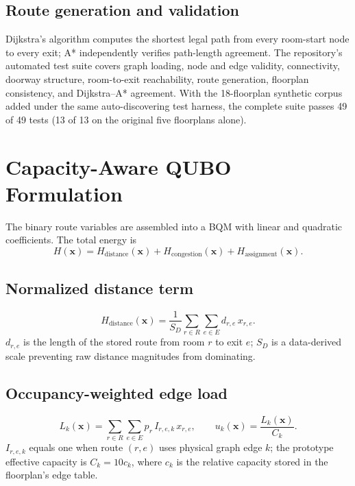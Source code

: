 \documentclass[11pt]{article}
\begin{document}
\subsection{Route generation and validation}
Dijkstra's algorithm computes the shortest legal path from every room-start node to every exit; A* independently verifies path-length agreement. The repository's automated test suite covers graph loading, node and edge validity, connectivity, doorway structure, room-to-exit reachability, route generation, floorplan consistency, and Dijkstra--A* agreement. With the 18-floorplan synthetic corpus added under the same auto-discovering test harness, the complete suite passes 49 of 49 tests (13 of 13 on the original five floorplans alone).

\section{Capacity-Aware QUBO Formulation}

The binary route variables are assembled into a BQM with linear and quadratic coefficients. The total energy is
\begin{equation}
H(\mathbf{x}) = H_{\text{distance}}(\mathbf{x}) + H_{\text{congestion}}(\mathbf{x}) + H_{\text{assignment}}(\mathbf{x}). \tag{2}
\end{equation}

\subsection{Normalized distance term}
\begin{equation}
H_{\text{distance}}(\mathbf{x}) = \frac{1}{S_D}\sum_{r \in R}\sum_{e \in E} d_{r,e}\, x_{r,e}. \tag{3}
\end{equation}
$d_{r,e}$ is the length of the stored route from room $r$ to exit $e$; $S_D$ is a data-derived scale preventing raw distance magnitudes from dominating.

\subsection{Occupancy-weighted edge load}
\begin{equation}
L_k(\mathbf{x}) = \sum_{r \in R}\sum_{e \in E} p_r\, I_{r,e,k}\, x_{r,e}, \qquad u_k(\mathbf{x}) = \frac{L_k(\mathbf{x})}{C_k}. \tag{4}
\end{equation}
$I_{r,e,k}$ equals one when route $(r,e)$ uses physical graph edge $k$; the prototype effective capacity is $C_k = 10 c_k$, where $c_k$ is the relative capacity stored in the floorplan's edge table.
\end{document}
